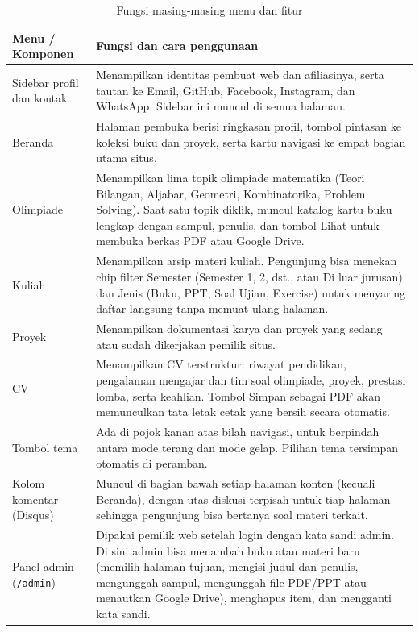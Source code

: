 \documentclass[12pt,a4paper]{article}
\begin{document}
	\begin{table}[h]
		\centering
		\small
		\begin{tabularx}{\textwidth}{@{}>{\raggedright\arraybackslash}p{3.4cm} L@{}}
			\toprule
			\textbf{Menu / Komponen} & \textbf{Fungsi dan cara penggunaan} \\
			\midrule
			Sidebar profil dan kontak & Menampilkan identitas pembuat web dan afiliasinya, serta tautan ke Email, GitHub, Facebook, Instagram, dan WhatsApp. Sidebar ini muncul di semua halaman. \\
			Beranda & Halaman pembuka berisi ringkasan profil, tombol pintasan ke koleksi buku dan proyek, serta kartu navigasi ke empat bagian utama situs. \\
			Olimpiade & Menampilkan lima topik olimpiade matematika (Teori Bilangan, Aljabar, Geometri, Kombinatorika, Problem Solving). Saat satu topik diklik, muncul katalog kartu buku lengkap dengan sampul, penulis, dan tombol Lihat untuk membuka berkas PDF atau Google Drive. \\
			Kuliah & Menampilkan arsip materi kuliah. Pengunjung bisa menekan chip filter Semester (Semester 1, 2, dst., atau Di luar jurusan) dan Jenis (Buku, PPT, Soal Ujian, Exercise) untuk menyaring daftar langsung tanpa memuat ulang halaman. \\
			Proyek & Menampilkan dokumentasi karya dan proyek yang sedang atau sudah dikerjakan pemilik situs. \\
			CV & Menampilkan CV terstruktur: riwayat pendidikan, pengalaman mengajar dan tim soal olimpiade, proyek, prestasi lomba, serta keahlian. Tombol Simpan sebagai PDF akan memunculkan tata letak cetak yang bersih secara otomatis. \\
			Tombol tema & Ada di pojok kanan atas bilah navigasi, untuk berpindah antara mode terang dan mode gelap. Pilihan tema tersimpan otomatis di peramban. \\
			Kolom komentar (Disqus) & Muncul di bagian bawah setiap halaman konten (kecuali Beranda), dengan utas diskusi terpisah untuk tiap halaman sehingga pengunjung bisa bertanya soal materi terkait. \\
			Panel admin (\texttt{/admin}) & Dipakai pemilik web setelah login dengan kata sandi admin. Di sini admin bisa menambah buku atau materi baru (memilih halaman tujuan, mengisi judul dan penulis, mengunggah sampul, mengunggah file PDF/PPT atau menautkan Google Drive), menghapus item, dan mengganti kata sandi. \\
			\bottomrule
		\end{tabularx}
		\caption{Fungsi masing-masing menu dan fitur}
	\end{table}
	
	
\end{document}

